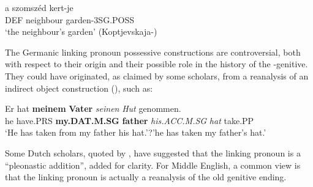 
\ea\label{}
\gll a  szomszéd  kert-je\\
DEF  neighbour  garden-3SG.POSS\\
\glt ‘the neighbour’s garden’ (Koptjevskaja-\citet[648]{Tamm2003}) 
\z

The Germanic linking pronoun possessive constructions are controversial, both with respect to their origin and their possible role in the history of the -genitive. They could have originated, as claimed by some scholars, from a reanalysis of an indirect object construction (\citet[638]{Behaghel1923}), such as:


\ea\label{}
\gll Er  hat  \textbf{meinem} \textbf{Vater} \textit{seinen}\textit{  Hut}\textit{  }genommen.\\
he  have.PRS  \textbf{my.DAT.M.SG} \textbf{father} \textit{his.ACC.M.SG}\textit{  }\textit{hat}\textit{  }take.PP\\
\glt ‘He has taken from my father his hat.’?’he has taken my father’s hat.’
\z

Some Dutch scholars, quoted by \citet[58]{Norde1997}, have suggested that the linking pronoun is a “pleonastic addition”, added for clarity. For Middle English, a common view is that the linking pronoun  is actually a reanalysis of the old genitive ending.


